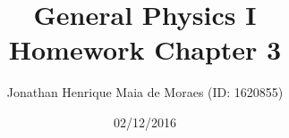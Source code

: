 \title{General Physics I \\ Homework Chapter 3}
\author{Jonathan Henrique Maia de Moraes (ID: 1620855)}
\date{02/12/2016}
\maketitle
